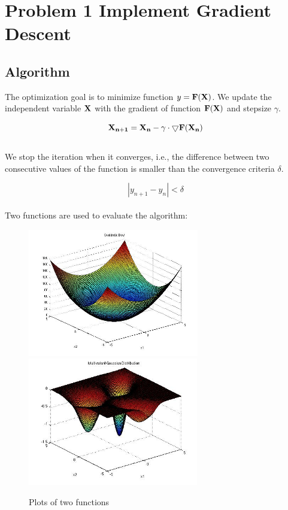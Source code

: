 \section{Problem 1 Implement Gradient Descent}

\subsection{Algorithm}
The optimization goal is to minimize function $y = \bf{F(X)}$. We update the independent variable $\bf{X}$ with the gradient of function $\bf{F(X)}$ and stepsize $\gamma$.

\begin{equation}
\bf{X_{n+1}} = \bf{X_{n}} - \gamma \cdot \bigtriangledown F(X_{n})
\end{equation}
\\
We stop the iteration when it converges, i.e., the difference between two consecutive values of the function is smaller than the convergence criteria $\delta$.

\begin{equation}
|y_{n+1} - y_n| < \delta
\end{equation}
\\
Two functions are used to evaluate the algorithm:

\begin{figure}[h]
 \centering
\includegraphics[height=2.2in]{figures/p1_QualdraticBowl} 
\includegraphics[height=2.2in]{figures/p1_MultivariantGaussian} 
    \caption{Plots of two functions}
    \label{fig:functions}
\end{figure}


